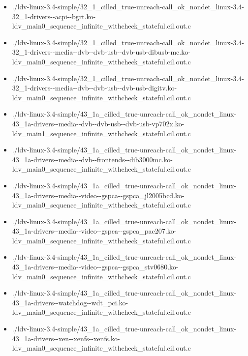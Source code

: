 \documentclass[envcountsame]{llncs}
\begin{document}
\begin{itemize}
\item ./ldv-linux-3.4-simple/32\_1\_cilled\_true-unreach-call\_ok\_nondet\_linux-3.4-32\_1-drivers-{}-acpi-{}-bgrt.ko-ldv\_main0\_sequence\_infinite\_withcheck\_stateful.cil.out.c
\item ./ldv-linux-3.4-simple/32\_1\_cilled\_true-unreach-call\_ok\_nondet\_linux-3.4-32\_1-drivers-{}-media-{}-dvb-{}-dvb-usb-{}-dvb-usb-dibusb-mc.ko-ldv\_main0\_sequence\_infinite\_withcheck\_stateful.cil.out.c
\item ./ldv-linux-3.4-simple/32\_1\_cilled\_true-unreach-call\_ok\_nondet\_linux-3.4-32\_1-drivers-{}-media-{}-dvb-{}-dvb-usb-{}-dvb-usb-digitv.ko-ldv\_main0\_sequence\_infinite\_withcheck\_stateful.cil.out.c
\item ./ldv-linux-3.4-simple/43\_1a\_cilled\_true-unreach-call\_ok\_nondet\_linux-43\_1a-drivers-{}-media-{}-dvb-{}-dvb-usb-{}-dvb-usb-vp702x.ko-ldv\_main1\_sequence\_infinite\_withcheck\_stateful.cil.out.c
\item ./ldv-linux-3.4-simple/43\_1a\_cilled\_true-unreach-call\_ok\_nondet\_linux-43\_1a-drivers-{}-media-{}-dvb-{}-frontends-{}-dib3000mc.ko-ldv\_main0\_sequence\_infinite\_withcheck\_stateful.cil.out.c
\item ./ldv-linux-3.4-simple/43\_1a\_cilled\_true-unreach-call\_ok\_nondet\_linux-43\_1a-drivers-{}-media-{}-video-{}-gspca-{}-gspca\_jl2005bcd.ko-ldv\_main0\_sequence\_infinite\_withcheck\_stateful.cil.out.c
\item ./ldv-linux-3.4-simple/43\_1a\_cilled\_true-unreach-call\_ok\_nondet\_linux-43\_1a-drivers-{}-media-{}-video-{}-gspca-{}-gspca\_pac207.ko-ldv\_main0\_sequence\_infinite\_withcheck\_stateful.cil.out.c
\item ./ldv-linux-3.4-simple/43\_1a\_cilled\_true-unreach-call\_ok\_nondet\_linux-43\_1a-drivers-{}-media-{}-video-{}-gspca-{}-gspca\_stv0680.ko-ldv\_main0\_sequence\_infinite\_withcheck\_stateful.cil.out.c
\item ./ldv-linux-3.4-simple/43\_1a\_cilled\_true-unreach-call\_ok\_nondet\_linux-43\_1a-drivers-{}-watchdog-{}-wdt\_pci.ko-ldv\_main0\_sequence\_infinite\_withcheck\_stateful.cil.out.c
\item ./ldv-linux-3.4-simple/43\_1a\_cilled\_true-unreach-call\_ok\_nondet\_linux-43\_1a-drivers-{}-xen-{}-xenfs-{}-xenfs.ko-ldv\_main0\_sequence\_infinite\_withcheck\_stateful.cil.out.c



\end{itemize}
\end{document}
